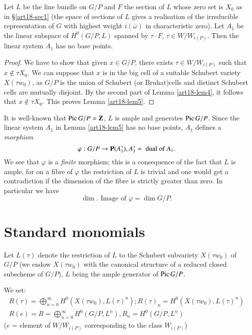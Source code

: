 \begin{lem}\label{art18-lem5}
Let $L$ be the line bundle on $G/P$ and $F$ the section of $L$ whose zero set is $X_0$ as in \S \ref{art18-sec1} (the space of sections of $L$ gives a realisation of the irreducible representation of $G$ with highest weight $i(\overline{\omega})$ in characteristic zero). Let $A_1$ be the linear subspace of $H^0(G/P, L)$ spanned by $\tau \cdot F$, $\tau \in W / W_{i(P)}$. Then the linear system $A_1$ has no base points.
\end{lem}

\begin{proof}
We have to show that given $x \in G/P$, there exists $\tau \in W / W_{i(P)}$ such that $x \not\in \tau X_0$. We can suppose that $x$ is in the big cell of a suitable Schubert variety $X(\tau w_0)$, as $G/P$ is the union of Schubert (or Bruhat)\pageoriginale cells and distinct Schubert cells are mutually disjoint. By the second part of Lemma \ref{art18-lem4}, it follows that $x \not\in \tau X_0$. This proves Lemma \ref{art18-lem5}.
\end{proof}

\begin{remark}\label{art18-rem1}
It is well-known that $\operatorname{Pic} G/P = \mathbf{Z}$, $L$ is ample and generates $\operatorname{Pic} G/P$. Since the linear system $A_1$ in Lemma \ref{art18-lem5} has no base points, $A_1$ defines a {\em morphism}
$$
\varphi : G/P \to \mathbf{P} (A^*_1), A^*_1 = \text{ dual of } A_1.
$$
We see that $\varphi$ is a {\em finite } morphism; this is a consequence of the fact that $L$ is ample, for on a fibre of $\varphi$ the restriction of $L$ is trivial and one would get a contradiction if the dimension of the fibre is strictly greater than zero. In particular we have 
$$
\dim. \text{ Image of } \varphi = \dim G / P.
$$
\end{remark}

\section{Standard monomials}\label{art18-sec3}
Let $L(\tau)$ denote the restriction of $L$ to the Schubert subvariety $X(\tau w_0)$ of $G/P$ (we endow $X(\tau w_0)$ with the canonical structure of a reduced closed subscheme of $G/P$), $L$ being the ample generator of $\operatorname{Pic} G/P$.

We set:
\begin{gather*}
R(\tau) = \bigoplus\limits^\infty_{n=0} H^0 (X (\tau w_0), L(\tau)^n); R (\tau)_n = H^0 (X (\tau w_0), L(\tau)^n)\\
R(e) = R = \bigoplus\limits^\infty_{n=0}H^0(G/P, L^n), R_n = H^0 (G/P, L^n)
\end{gather*}
($e$ = element of $W/W_{i(P)}$ corresponding to the class $W_{i(P)}$) 


